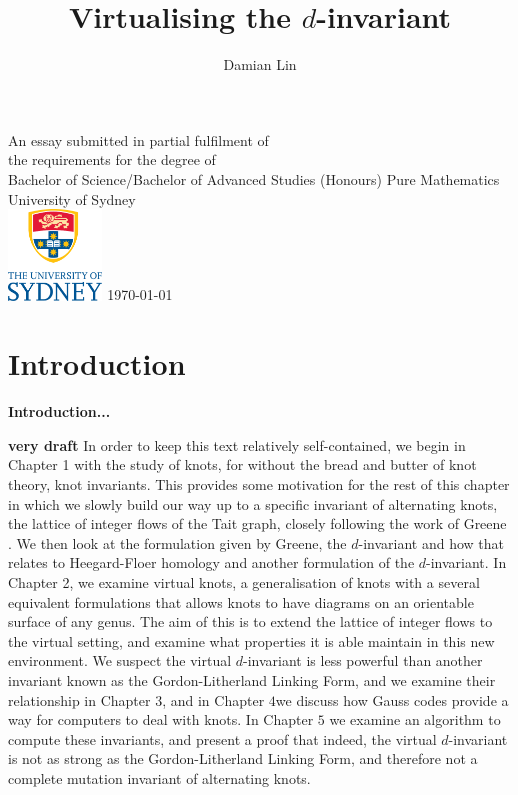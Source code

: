 \documentclass[12pt]{report}
\newcommand{\notered}[1]{{\color{Red} \textbf{#1}}}
\newcommand{\notegreen}[1]{{\color{Green} \textbf{#1}}}
\begin{document}
	

\author{Damian Lin}
\title{Virtualising the $d$-invariant}

\cleardoublepage \thispagestyle{empty}
\null \vfil
\begingroup
\LARGE \bfseries \centering
\openup \medskipamount
\thetitle \par \vspace{30pt}
\centering \mdseries \theauthor \par \bigskip
\endgroup
\vfil \vfil \vfil
\begin{center}
	An essay submitted in partial fulfilment of\\
	the requirements for the degree of\\
	Bachelor of Science/Bachelor of Advanced Studies (Honours)
	\vfil\vfil
	{\large Pure Mathematics\\[5pt]
		University of Sydney}\\
	\vskip6mm
	\includegraphics[width=25mm]{graphics/USY_MB1_CMYK_Stacked_Logo}
	\vfil
	\normalsize\today
\end{center}
\vfil
\cleardoublepage

\tableofcontents

\chapter*{Introduction}

\notegreen{Introduction...}

\notered{very draft}
In order to keep this text relatively self-contained, we begin in Chapter 1 with the study of knots, for without the bread and butter of knot theory, knot invariants. This provides some motivation for the rest of this chapter in which we slowly build our way up to a specific invariant of alternating knots, the lattice of integer flows of the Tait graph, closely following the work of Greene \cite{lattices-graphs-mutation}. We then look at the formulation given by Greene, the $d$-invariant and how that relates to Heegard-Floer homology and another formulation of the $d$-invariant. In Chapter 2, we examine virtual knots, a generalisation of knots with a several equivalent formulations that allows knots to have diagrams on an orientable surface of any genus. The aim of this is to extend the lattice of integer flows to the virtual setting, and examine what properties it is able maintain in this new environment. We suspect the virtual $d$-invariant is less powerful than another invariant known as the Gordon-Litherland Linking Form, and we examine their relationship in Chapter $3$, and in Chapter $4$we discuss how Gauss codes provide a way for computers to deal with knots. In Chapter $5$ we examine an algorithm to compute these invariants, and present a proof that indeed, the virtual $d$-invariant is not as strong as the Gordon-Litherland Linking Form, and therefore not a complete mutation invariant of alternating knots.
\end{document}
